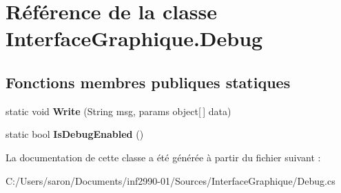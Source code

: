 \hypertarget{class_interface_graphique_1_1_debug}{\section{Référence de la classe Interface\-Graphique.\-Debug}
\label{class_interface_graphique_1_1_debug}
}
\subsection*{Fonctions membres publiques statiques}
\begin{DoxyCompactItemize}
\item 
\hypertarget{class_interface_graphique_1_1_debug_a540c6c5d53e75f5710492b0254eaf0a3}{static void {\bfseries Write} (String msg, params object\mbox{[}$\,$\mbox{]} data)}\label{class_interface_graphique_1_1_debug_a540c6c5d53e75f5710492b0254eaf0a3}

\item 
\hypertarget{class_interface_graphique_1_1_debug_a86721cc22d894c08f05abfb82e07f494}{static bool {\bfseries Is\-Debug\-Enabled} ()}\label{class_interface_graphique_1_1_debug_a86721cc22d894c08f05abfb82e07f494}

\end{DoxyCompactItemize}


La documentation de cette classe a été générée à partir du fichier suivant \-:\begin{DoxyCompactItemize}
\item 
C\-:/\-Users/saron/\-Documents/inf2990-\/01/\-Sources/\-Interface\-Graphique/Debug.\-cs\end{DoxyCompactItemize}
